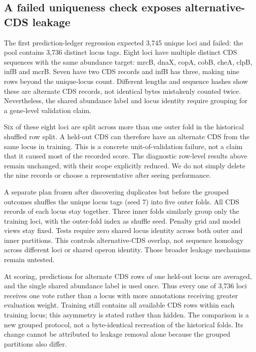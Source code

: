\subsection{A failed uniqueness check exposes alternative-CDS leakage}
The first prediction-ledger regression expected 3,745 unique loci and failed: the pool contains 3,736 distinct locus tags. Eight loci have multiple distinct CDS sequences with the same abundance target: mrcB, dnaX, copA, cobB, cheA, clpB, infB and mcrB. Seven have two CDS records and infB has three, making nine rows beyond the unique-locus count. Different lengths and sequence hashes show these are alternate CDS records, not identical bytes mistakenly counted twice. Nevertheless, the shared abundance label and locus identity require grouping for a gene-level validation claim.

Six of these eight loci are split across more than one outer fold in the historical shuffled row split. A held-out CDS can therefore have an alternate CDS from the same locus in training. This is a concrete unit-of-validation failure, not a claim that it caused most of the recorded score. The diagnostic row-level results above remain unchanged, with their scope explicitly reduced. We do not simply delete the nine records or choose a representative after seeing performance.

A separate plan frozen after discovering duplicates but before the grouped outcomes shuffles the unique locus tags (seed 7) into five outer folds. All CDS records of each locus stay together. Three inner folds similarly group only the training loci, with the outer-fold index as shuffle seed. Penalty grid and model views stay fixed. Tests require zero shared locus identity across both outer and inner partitions. This controls alternative-CDS overlap, not sequence homology across different loci or shared operon identity. Those broader leakage mechanisms remain untested.

At scoring, predictions for alternate CDS rows of one held-out locus are averaged, and the single shared abundance label is used once. Thus every one of 3,736 loci receives one vote rather than a locus with more annotations receiving greater evaluation weight. Training still contains all available CDS rows within each training locus; this asymmetry is stated rather than hidden. The comparison is a new grouped protocol, not a byte-identical recreation of the historical folds. Its change cannot be attributed to leakage removal alone because the grouped partitions also differ.

